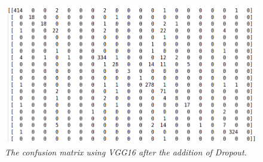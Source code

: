 \documentclass[12pt,a4paper]{report}
\begin{document}
\begin{figure}[H]
\centering
\includegraphics[scale=0.4]{./immagini/vgg16/2_data_augmentation_-_30_epochs_no_stopping_-_dropout_0p5_-_no_batch_norm/cm_num.png}
\caption{\textit{The confusion matrix using VGG16 after the addition of Dropout.}}
\end{figure}
\end{document}
